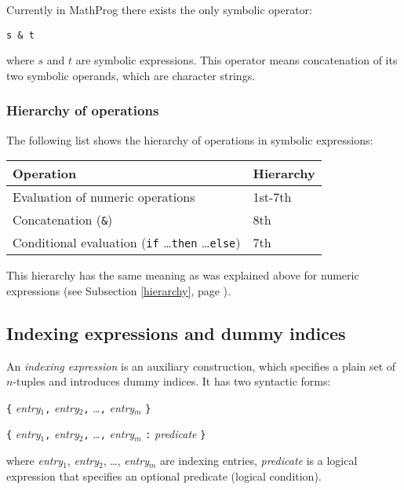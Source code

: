 \documentclass[10pt]{article}
\begin{document}
Currently in MathProg there exists the only symbolic operator:

\medskip

\noindent\hfil
{\tt s \& t}

\medskip

\noindent where $s$ and $t$ are symbolic expressions. This operator
means concatenation of its two symbolic operands, which are character
strings.

\subsubsection{Hierarchy of operations}

The following list shows the hierarchy of operations in symbolic
expressions:

\medskip

\noindent\hfil
\begin{tabular}{@{}ll@{}}
Operation&Hierarchy\\
\hline
Evaluation of numeric operations&1st-7th\\
Concatenation ({\tt\&})&8th\\
Conditional evaluation ({\tt if} \dots {\tt then} \dots {\tt else})&
7th\\
\end{tabular}

\medskip

This hierarchy has the same meaning as was explained above for numeric
expressions (see Subsection \ref{hierarchy}, page \pageref{hierarchy}).

\subsection{Indexing expressions and dummy indices}
\label{indexing}

An {\it indexing expression} is an auxiliary construction, which
specifies a plain set of $n$-tuples and introduces dummy indices. It
has two syntactic forms:

\medskip

\noindent\hspace{73.5pt}
{\tt\{} {\it entry}$_1${\tt,} {\it entry}$_2${\tt,} \dots{\tt,}
{\it entry}$_m$ {\tt\}}

\medskip

\noindent\hfil
{\tt\{} {\it entry}$_1${\tt,} {\it entry}$_2${\tt,} \dots{\tt,}
{\it entry}$_m$ {\tt:} {\it predicate} {\tt\}}

\medskip

\noindent where {\it entry}{$_1$}, {\it entry}{$_2$}, \dots,
{\it entry}{$_m$} are indexing entries, {\it predicate} is a logical
expression that specifies an optional predicate (logical condition).
\end{document}
